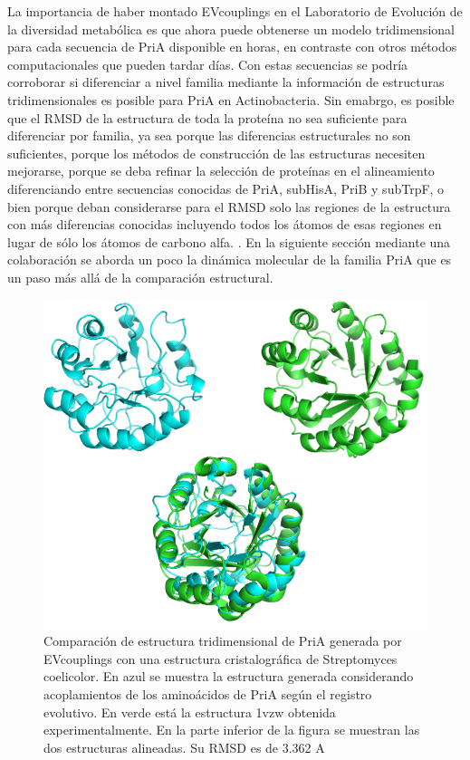 \documentclass[12pt,twoside]{reedthesis}
\begin{document}
  La importancia de haber montado EVcouplings en el Laboratorio de
  Evolución de la diversidad metabólica es que ahora puede obtenerse un
  modelo tridimensional para cada secuencia de PriA disponible en horas,
  en contraste con otros métodos computacionales que pueden tardar días.
  Con estas secuencias se podría corroborar si diferenciar a nivel familia
  mediante la información de estructuras tridimensionales es posible para
  PriA en Actinobacteria. Sin emabrgo, es posible que el RMSD de la
  estructura de toda la proteína no sea suficiente para diferenciar por
  familia, ya sea porque las diferencias estructurales no son suficientes,
  porque los métodos de construcción de las estructuras necesiten
  mejorarse, porque se deba refinar la selección de proteínas en el
  alineamiento diferenciando entre secuencias conocidas de PriA, subHisA,
  PriB y subTrpF, o bien porque deban considerarse para el RMSD solo las
  regiones de la estructura con más diferencias conocidas incluyendo todos
  los átomos de esas regiones en lugar de sólo los átomos de carbono alfa.
  . En la siguiente sección mediante una colaboración se aborda un poco la
  dinámica molecular de la familia PriA que es un paso más allá de la
  comparación estructural.
  
  \begin{figure}[h!tbp]
  \centering
  \includegraphics[angle = 0,scale = .5]{chapter4/Couplings/PriACouplingFoldings.png}
  \caption[Superposición de estructura de PriA generado por Folding con la estructura cristalográfica]{\footnotesize{Comparación de estructura tridimensional de PriA generada por EVcouplings con una estructura cristalográfica de {Streptomyces} {coelicolor}. En azul se muestra la estructura generada considerando acoplamientos de los aminoácidos de PriA según el registro evolutivo. En verde está la estructura 1vzw obtenida experimentalmente. En la parte inferior de la figura se muestran las dos estructuras alineadas. Su RMSD es de 3.362 
  {A}}}
  \label{fig:CouplingsFoldingPriA}
  \end{figure}
  
\end{document}
